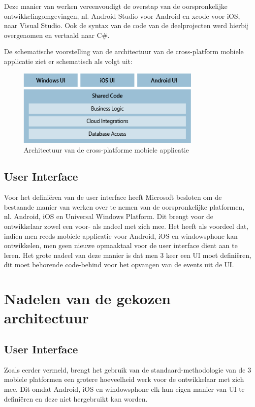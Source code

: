Deze manier van werken vereenvoudigt de overstap van de oorspronkelijke ontwikkelingomgevingen, nl. Android Studio voor Android en xcode voor iOS, naar Visual Studio.
Ook de syntax van de code van de deelprojecten werd hierbij overgenomen en vertaald naar C\#.

De schematische voorstelling van de architectuur van de cross-platform mobiele applicatie ziet er schematisch als volgt uit:
\begin{figure}[ht!]
\centering
\caption{Architectuur van de cross-platforme mobiele applicatie \cite{joshholmes2017}}
\includegraphics[width=90mm]{./img/architecture.png}
\end{figure}

\subsection{User Interface}
Voor het definiëren van de user interface heeft Microsoft besloten om de bestaande manier van werken over te nemen van de oorspronkelijke platformen, nl. Android, iOS en Universal Windows Platform.
Dit brengt voor de ontwikkelaar zowel een voor- als nadeel met zich mee. Het heeft als voordeel dat, indien men reeds mobiele applicatie voor Android, iOS en windowsphone kan ontwikkelen, men geen
nieuwe opmaaktaal voor de user interface dient aan te leren. Het grote nadeel van deze manier is dat men 3 keer een UI moet definiëren,
dit moet behorende code-behind voor het opvangen van de events uit de UI.

\label{sec:nadelenvandegekozenapparchitectuur}
\section{Nadelen van de gekozen architectuur}
\subsection{User Interface}
Zoals eerder vermeld, brengt het gebruik van de standaard-methodologie van de 3 mobiele platformen een grotere hoeveelheid
werk voor de ontwikkelaar met zich mee. Dit omdat Android, iOS en windowsphone elk hun eigen manier van UI te definiëren en deze niet hergebruikt kan worden.

